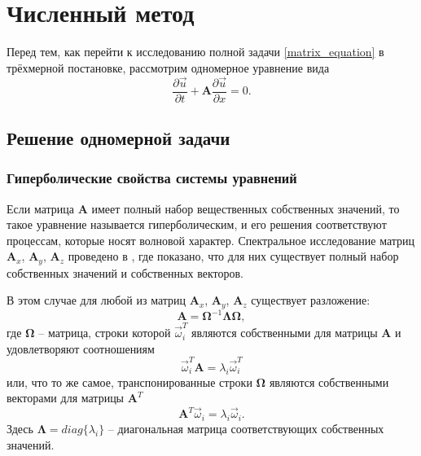\section{Численный метод}

Перед тем, как перейти к исследованию полной задачи \ref{matrix_equation} в трёхмерной постановке, рассмотрим одномерное уравнение вида
\begin{equation}
\frac{\partial\vec{u}}{\partial{t}}+\mathbf{A}\frac{\partial\vec{u}}{\partial{x}}=0.
\label{advection_equation}
\end{equation}

\subsection{Решение одномерной задачи}

\subsubsection{Гиперболические свойства системы уравнений}
\label{sec:hyperbolic_features}

Если матрица $\mathbf{A}$ имеет полный набор вещественных собственных значений, 
то такое уравнение называется гиперболическим, и его решения соответствуют 
процессам, которые носят волновой характер. Спектральное исследование матриц $\mathbf{A}_x$, $\mathbf{A}_y$, $\mathbf{A}_z$ проведено в \cite{chelnokov}, где показано, что для них существует полный набор собственных значений и собственных векторов.

В этом случае для любой из матриц $\mathbf{A}_x$, $\mathbf{A}_y$, $\mathbf{A}_z$ существует разложение:
\begin{equation}
\mathbf{A}=\mathbf\Omega^{-1}\mathbf\Lambda\mathbf\Omega,
\end{equation}
где $\mathbf\Omega$ -- матрица, строки которой $\vec\omega_i^T$ являются собственными для матрицы $\mathbf A$ и
удовлетворяют соотношениям
\begin{equation}
\vec\omega_i^T\mathbf A=\lambda_i\vec\omega_i^T
\end{equation}
или, что то же самое, транспонированные строки $\mathbf\Omega$ являются собственными векторами для матрицы $\mathbf A^T$
\begin{equation}
\mathbf A^T\vec\omega_i=\lambda_i\vec\omega_i.
\end{equation}
Здесь $\mathbf\Lambda=diag\{\lambda_i\}$ -- диагональная матрица соответствующих собственных значений.

